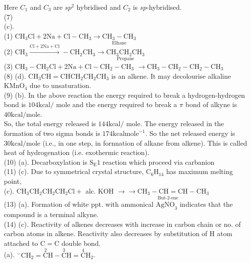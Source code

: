 \documentclass[10pt]{article}
\begin{document}
Here $C_{1}$ and $C_{3}$ are $s p^{2}$ hybridised and $C_{2}$ is $s p$-hybridised.\\
(7)\\
(c).\\
(1) $\mathrm{CH}_{3} \mathrm{Cl}+2 \mathrm{Na}+\mathrm{Cl}-\mathrm{CH}_{3} \rightarrow \underset{\text { Elhane }}{\mathrm{CH}_{3}-\mathrm{CH}_{3}}$\\
(2) $\mathrm{CH}_{3} \xrightarrow{\mathrm{Cl}+2 \mathrm{Na}+\mathrm{Cl}}-\mathrm{CH}_{2} \mathrm{CH}_{3} \rightarrow \underset{\text { Propane }}{\mathrm{CH}_{3} \mathrm{CH}_{2} \mathrm{CH}_{3}}$\\
(3) $\mathrm{CH}_{3}-\mathrm{CH}_{2} \mathrm{Cl}+2 \mathrm{Na}+\mathrm{Cl}-\mathrm{CH}_{2}-\mathrm{CH}_{3}$ $\rightarrow \mathrm{CH}_{3}-\mathrm{CH}_{2}-\mathrm{CH}_{2}-\mathrm{CH}_{3}$\\
(8) (d). $\mathrm{CH}_{3} \mathrm{CH}=\mathrm{CHCH}_{2} \mathrm{CH}_{2} \mathrm{CH}_{3}$ is an alkene. It may decolourise alkaline $\mathrm{KMnO}_{4}$ due to unsaturation.\\
(9) (b). In the above reaction the energy required to break a hydrogen-hydrogen bond is $104 \mathrm{kcal} /$ mole and the energy required to break a $\pi$ bond of alkyne is $40 \mathrm{kcal} / \mathrm{mole}$.\\
So, the total energy released is $144 \mathrm{kcal} /$ mole. The energy released in the formation of two sigma bonds is $174 \mathrm{kcal} \mathrm{mole}^{-1}$. So the net released energy is $30 \mathrm{kcal} / \mathrm{mole}$ (i.e., in one step, in fornnation of alkane from alkene). This is called heat of hydrogenation (i.e. exothermic reaction).\\
(10) (a). Decarboxylation is $\mathrm{S}_{\mathrm{E}} 1$ reaction which proceed via carbanion\\
(11) (c). Due to symmetrical crystal structure, $\mathrm{C}_{6} \mathrm{H}_{14}$ has maximum melting point,\\
(c). $\mathrm{CH}_{3} \mathrm{CH}_{2} \mathrm{CH}_{2} \mathrm{CH}_{2} \mathrm{Cl}+$ alc. KOH $\rightarrow \underset{\text { But-2-ene }}{\rightarrow \mathrm{CH}_{3}-\mathrm{CH}=\mathrm{CH}-\mathrm{CH}_{3}}$\\
(13) (a). Formation of white ppt. with ammonical $\mathrm{AgNO}_{3}$ indicates that the compound is a terminal alkyne.\\
(14) (c). Reactivity of alkenes decreases with increase in carbon chain or no. of carbon atoms in alkene. Reactivity also decreases by substitution of H atom attached to $\mathrm{C}=\mathrm{C}$ double bond.\\
(a). ${ }^{-} \mathrm{CH}_{2}=\stackrel{2}{\mathrm{C}} \mathrm{H}-\stackrel{3}{\mathrm{C}} \mathrm{H}=\stackrel{4}{\mathrm{C}} \mathrm{H}_{2}$.
\end{document}
